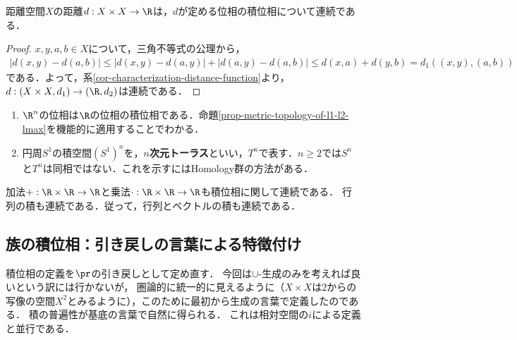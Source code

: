 \documentclass[uplatex,dvipdfmx]{jsreport}
\begin{document}
\begin{corollary}[距離関数は連続である]
    距離空間$X$の距離$d:X\times X\to\R$は，$d$が定める位相の積位相について連続である．
\end{corollary}
\begin{proof}
    $x,y,a,b\in X$について，三角不等式の公理から，
    \begin{align*}
        |d(x,y)-d(a,b)|\le|d(x,y)-d(a,y)|+|d(a,y)-d(a,b)|\le d(x,a)+d(y,b)=d_1((x,y),(a,b))
    \end{align*}
    である．よって，系\ref{cor-characterization-distance-function}より，$d:(X\times X,d_1)\to (\R,d_2)$は連続である．
\end{proof}

\begin{example}[torus]\mbox{}
    \begin{enumerate}
        \item $\R^n$の位相は$\R$の位相の積位相である．命題\ref{prop-metric-topology-of-l1-l2-lmax}を機能的に適用することでわかる．
        \item 円周$S^1$の積空間$(S^1)^n$を，\textbf{$n$次元トーラス}といい，$T^n$で表す．$n\ge 2$では$S^n$と$T^n$は同相ではない．これを示すにはHomology群の方法がある．
    \end{enumerate}
\end{example}

\begin{corollary}[代表的な演算は連続である]
    加法$+:\R\times\R\to\R$と乗法$\cdot:\R\times\R\to\R$も積位相に関して連続である．
    行列の積も連続である．従って，行列とベクトルの積も連続である．
\end{corollary}

\subsection{族の積位相：引き戻しの言葉による特徴付け}

\begin{tcolorbox}[colframe=ForestGreen, colback=ForestGreen!10!white, breakable ,colbacktitle=ForestGreen!40!white, coltitle=black,fonttitle=\bfseries\sffamily
    ,title=族の積位相とは，開集合の単一引き戻しが有限$\cap$-生成する集合が基底となり，$\cup$-生成するもの]
    積位相の定義を$\pr$の引き戻しとして定め直す．
    今回は$\cup$-生成のみを考えれば良いという訳には行かないが，
    圏論的に統一的に見えるように（$X\times X$は$2$からの写像の空間$X^2$とみるように），このために最初から生成の言葉で定義したのである．
    積の普遍性が基底の言葉で自然に得られる．
    これは相対空間の$i$による定義と並行である．
\end{tcolorbox}
\end{document}
